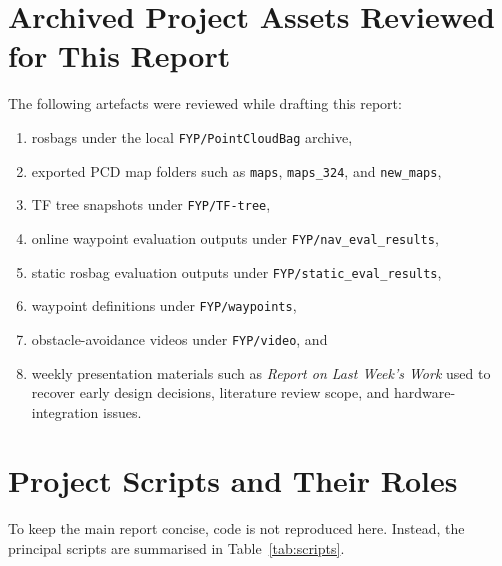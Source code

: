 \documentclass[12pt,a4paper]{report}
\begin{document}
\appendix

\chapter{Archived Project Assets Reviewed for This Report}
The following artefacts were reviewed while drafting this report:
\begin{enumerate}[leftmargin=2em]
    \item rosbags under the local \texttt{FYP/PointCloudBag} archive,
    \item exported PCD map folders such as \texttt{maps}, \texttt{maps\_324}, and \texttt{new\_maps},
    \item TF tree snapshots under \texttt{FYP/TF-tree},
    \item online waypoint evaluation outputs under \texttt{FYP/nav\_eval\_results},
    \item static rosbag evaluation outputs under \texttt{FYP/static\_eval\_results},
    \item waypoint definitions under \texttt{FYP/waypoints},
    \item obstacle-avoidance videos under \texttt{FYP/video}, and
    \item weekly presentation materials such as \emph{Report on Last Week's Work} used to recover early design decisions, literature review scope, and hardware-integration issues.
\end{enumerate}

\chapter{Project Scripts and Their Roles}
To keep the main report concise, code is not reproduced here. Instead, the principal scripts are summarised in Table~\ref{tab:scripts}.
\end{document}
